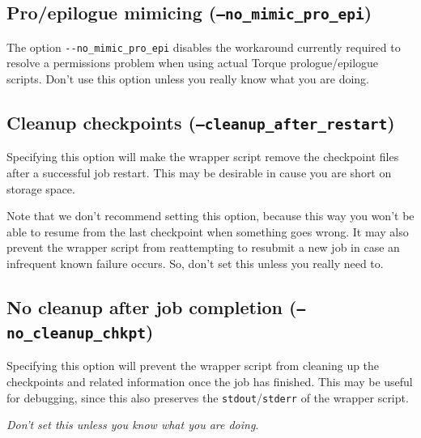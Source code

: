 \subsection{Pro/epilogue mimicing (\texttt{--no\_mimic\_pro\_epi})}

The option \lstinline|--no_mimic_pro_epi| disables the workaround currently required to resolve
a permissions problem when using actual Torque prologue/epilogue scripts. Don't use
this option unless you really know what you are doing.

\subsection{Cleanup checkpoints (\texttt{--cleanup\_after\_restart})}

Specifying this option will make the wrapper script remove the checkpoint files after
a successful job restart. This may be desirable in cause you are short on storage space.

Note that we don't recommend setting this option, because this way you won't be able
to resume from the last checkpoint when something goes wrong. It may also prevent
the wrapper script from reattempting to resubmit a new job in case an infrequent known
failure occurs. So, don't set this unless you really need to.

\subsection{No cleanup after job completion (\texttt{--no\_cleanup\_chkpt})}

Specifying this option will prevent the wrapper script from cleaning up the
checkpoints and related information once the job has finished. This may be useful
for debugging, since this also preserves the \lstinline|stdout|/\lstinline|stderr|
of the wrapper script.

\emph{Don't set this unless you know what you are doing}.
